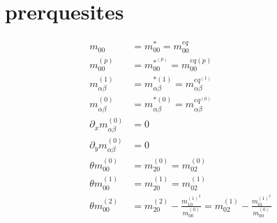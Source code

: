 \documentclass{article}
\begin{document}
  \section{prerquesites}
  \begin{align}
    m_{00} &= m_{00}^* = m_{00}^{eq}  \tag{P1}\\
    m_{00}^{(p)} &= m_{00}^{*^{(p)}} = m_{00}^{eq(p)} \tag{P2} \\
    m_{\alpha\beta}^{(1)} &= m_{\alpha\beta}^{*(1)} = m_{\alpha\beta}^{eq^{(1)}} \tag{P3} \\
    m_{\alpha\beta}^{(0)} &= m_{\alpha\beta}^{*(0)} = m_{\alpha\beta}^{eq^{(0)}} \tag{P4} \\
    \partial_x m_{\alpha\beta}^{(0)} &= 0  \tag{P5} \\
    \partial_y m_{\alpha\beta}^{(0)} &= 0  \tag{P6} \\
    \theta m_{00}^{(0)} &= m_{20}^{(0)} = m_{02}^{(0)} \tag{P7} \\
    \theta m_{00}^{(1)} &= m_{20}^{(1)} = m_{02}^{(1)} \tag{P8}\\
    \theta m_{00}^{(2)} &= m_{20}^{(2)} - \frac{m_{10}^{{(1)}^2}}{m_{00}^{(0)}}  = m_{02}^{(1)} - \frac{m_{01}^{{(1)}^2}}{m_{00}^{(0)}} \tag{P9}
  \end{align}
\end{document}
